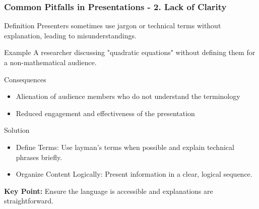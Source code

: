 \documentclass[aspectratio=169]{beamer}
\begin{document}
\begin{frame}[fragile]
    \frametitle{Common Pitfalls in Presentations - 2. Lack of Clarity}
    \begin{block}{Definition}
        Presenters sometimes use jargon or technical terms without explanation, leading to misunderstandings.
    \end{block}
    \begin{exampleblock}{Example}
        A researcher discussing "quadratic equations" without defining them for a non-mathematical audience.
    \end{exampleblock}
    \begin{block}{Consequences}
        \begin{itemize}
            \item Alienation of audience members who do not understand the terminology 
            \item Reduced engagement and effectiveness of the presentation
        \end{itemize}
    \end{block}
    \begin{block}{Solution}
        \begin{itemize}
            \item Define Terms: Use layman’s terms when possible and explain technical phrases briefly.
            \item Organize Content Logically: Present information in a clear, logical sequence.
        \end{itemize}
    \end{block}
    \textbf{Key Point:} Ensure the language is accessible and explanations are straightforward.
\end{frame}
\end{document}
